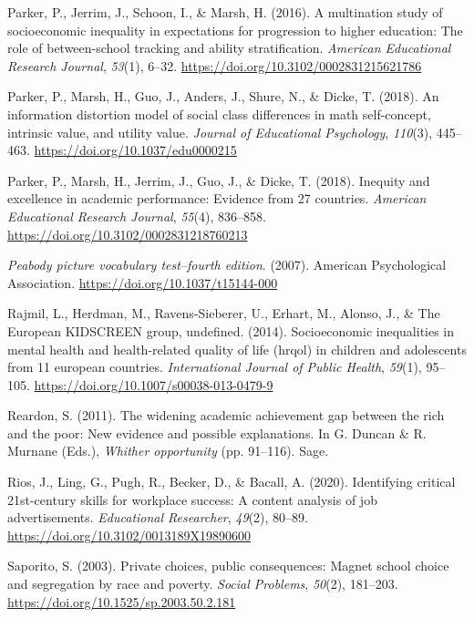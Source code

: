 \documentclass[
  english,
  man]{apa6}
\newlength{\cslhangindent}
\newenvironment{cslreferences}%
  {\setlength{\parindent}{0pt}%
  \everypar{\setlength{\hangindent}{\cslhangindent}}\ignorespaces}%
  {\par}
\begin{document}
\begin{cslreferences}
\leavevmode\hypertarget{ref-parker2016}{}%
Parker, P., Jerrim, J., Schoon, I., \& Marsh, H. (2016). A multination study of socioeconomic inequality in expectations for progression to higher education: The role of between-school tracking and ability stratification. \emph{American Educational Research Journal}, \emph{53}(1), 6--32. \url{https://doi.org/10.3102/0002831215621786}

\leavevmode\hypertarget{ref-parker_information_2018}{}%
Parker, P., Marsh, H., Guo, J., Anders, J., Shure, N., \& Dicke, T. (2018). An information distortion model of social class differences in math self-concept, intrinsic value, and utility value. \emph{Journal of Educational Psychology}, \emph{110}(3), 445--463. \url{https://doi.org/10.1037/edu0000215}

\leavevmode\hypertarget{ref-parker2018}{}%
Parker, P., Marsh, H., Jerrim, J., Guo, J., \& Dicke, T. (2018). Inequity and excellence in academic performance: Evidence from 27 countries. \emph{American Educational Research Journal}, \emph{55}(4), 836--858. \url{https://doi.org/10.3102/0002831218760213}

\leavevmode\hypertarget{ref-dunn2007}{}%
\emph{Peabody picture vocabulary test--fourth edition}. (2007). American Psychological Association. \url{https://doi.org/10.1037/t15144-000}

\leavevmode\hypertarget{ref-rajmil2014}{}%
Rajmil, L., Herdman, M., Ravens-Sieberer, U., Erhart, M., Alonso, J., \& The European KIDSCREEN group, undefined. (2014). Socioeconomic inequalities in mental health and health-related quality of life (hrqol) in children and adolescents from 11 european countries. \emph{International Journal of Public Health}, \emph{59}(1), 95--105. \url{https://doi.org/10.1007/s00038-013-0479-9}

\leavevmode\hypertarget{ref-reardon2011}{}%
Reardon, S. (2011). The widening academic achievement gap between the rich and the poor: New evidence and possible explanations. In G. Duncan \& R. Murnane (Eds.), \emph{Whither opportunity} (pp. 91--116). Sage.

\leavevmode\hypertarget{ref-rios2020}{}%
Rios, J., Ling, G., Pugh, R., Becker, D., \& Bacall, A. (2020). Identifying critical 21st-century skills for workplace success: A content analysis of job advertisements. \emph{Educational Researcher}, \emph{49}(2), 80--89. \url{https://doi.org/10.3102/0013189X19890600}

\leavevmode\hypertarget{ref-saporito2003}{}%
Saporito, S. (2003). Private choices, public consequences: Magnet school choice and segregation by race and poverty. \emph{Social Problems}, \emph{50}(2), 181--203. \url{https://doi.org/10.1525/sp.2003.50.2.181}


\end{cslreferences}
\end{document}
